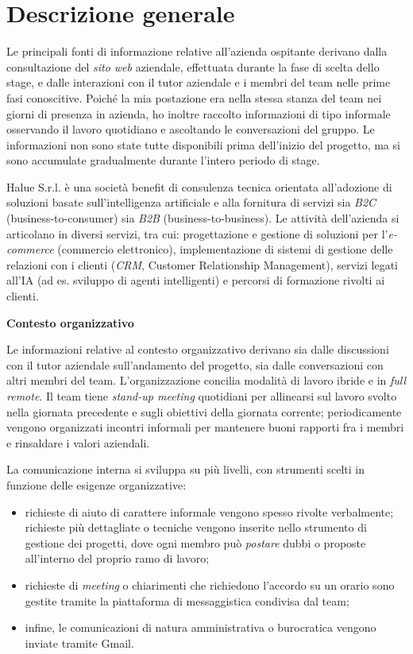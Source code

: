\section{Descrizione generale}

Le principali fonti di informazione relative all'azienda ospitante derivano dalla consultazione del \emph{sito web} aziendale, effettuata durante la fase di scelta dello stage, 
e dalle interazioni con il tutor aziendale e i membri del team nelle prime fasi conoscitive. Poiché la mia postazione era nella stessa stanza del team nei giorni di presenza in azienda, 
ho inoltre raccolto informazioni di tipo informale osservando il lavoro quotidiano e ascoltando le conversazioni del gruppo. Le informazioni non sono state tutte disponibili prima dell'inizio del progetto, 
ma si sono accumulate gradualmente durante l'intero periodo di stage.

Halue S.r.l. è una società benefit di consulenza tecnica orientata all'adozione di soluzioni basate sull'intelligenza artificiale e alla fornitura di servizi 
sia \emph{B2C} (business-to-consumer) sia \emph{B2B} (business-to-business). 
Le attività dell'azienda si articolano in diversi servizi, tra cui: progettazione e gestione di soluzioni per l'\emph{e-commerce} (commercio elettronico), 
implementazione di sistemi di gestione delle relazioni con i clienti (\emph{CRM}, Customer Relationship Management), 
servizi legati all'IA (ad es. sviluppo di agenti intelligenti) e percorsi di formazione rivolti ai clienti.

\medskip
\noindent\textbf{Contesto organizzativo}

Le informazioni relative al contesto organizzativo derivano sia dalle discussioni con il tutor aziendale sull'andamento del progetto, 
sia dalle conversazioni con altri membri del team. L'organizzazione concilia modalità di lavoro ibride e in \emph{full remote}. 
Il team tiene \emph{stand-up meeting} quotidiani per allinearsi sul lavoro svolto nella giornata precedente e sugli obiettivi della giornata corrente; 
periodicamente vengono organizzati incontri informali per mantenere buoni rapporti fra i membri e rinsaldare i valori aziendali.

La comunicazione interna si sviluppa su più livelli, con strumenti scelti in funzione delle esigenze organizzative:

\begin{itemize}
\item richieste di aiuto di carattere informale vengono spesso rivolte verbalmente; richieste più dettagliate o tecniche vengono inserite nello strumento di gestione dei progetti, dove ogni membro può \emph{postare} dubbi o proposte all'interno del proprio ramo di lavoro;
\item richieste di \emph{meeting} o chiarimenti che richiedono l'accordo su un orario sono gestite tramite la piattaforma di messaggistica condivisa dal team;
\item infine, le comunicazioni di natura amministrativa o burocratica vengono inviate tramite Gmail.
\end{itemize}

